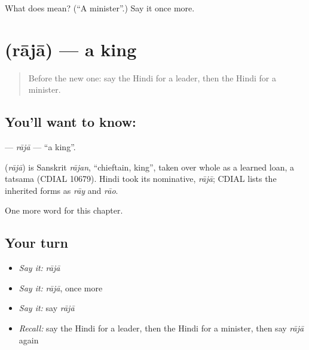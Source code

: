 \begin{tcolorbox}[breakable,colback=teal!4,colframe=teal!35!black,title={Before you move on}]
What does  mean? (\textquotedblleft{}A minister\textquotedblright{}.) Say it once more.
\end{tcolorbox}
\section[\texorpdfstring{\hi{राजा} (rājā)}{राजा (rājā)}]{ (rājā) — a king}

\label{lesson:HI-C196-raja}



\begin{quote}
Before the new one: say the Hindi for a leader, then the Hindi for a minister.
\end{quote}

\subsection*{You'll want to know: }
\textbf{} — \emph{rājā} — \textquotedblleft{}a king\textquotedblright{}.

\begin{cousinweb}
\textbf{} (\emph{rājā}) is Sanskrit \emph{rājan}, \textquotedblleft{}chieftain, king\textquotedblright{}, taken over whole as a learned loan, a tatsama (CDIAL 10679). Hindi took its nominative, \emph{rājā}; CDIAL lists the inherited forms as \emph{rāy} and \emph{rāo}.
\end{cousinweb}

\begin{grammarlens}[title={What you've built}]
One more word for this chapter.
\end{grammarlens}

\subsection*{Your turn}
\begin{itemize}
\raggedright
  \item \emph{Say it:} \emph{rājā}
  \item \emph{Say it:} \emph{rājā}, once more
  \item \emph{Say it:} say \emph{rājā}
  \item \emph{Recall:} say the Hindi for a leader, then the Hindi for a minister, then say \emph{rājā} again
\end{itemize}

